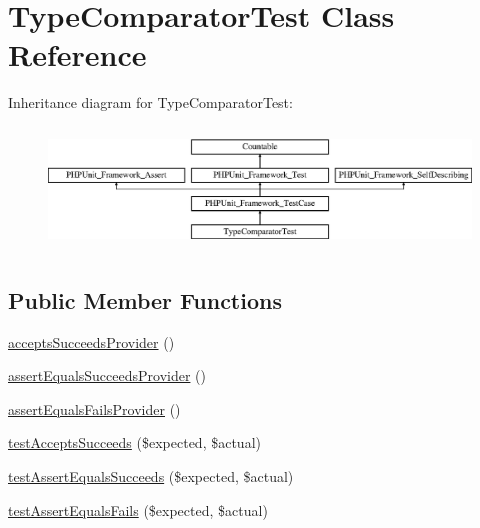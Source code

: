 \hypertarget{class_sebastian_bergmann_1_1_comparator_1_1_type_comparator_test}{}\section{Type\+Comparator\+Test Class Reference}
\label{class_sebastian_bergmann_1_1_comparator_1_1_type_comparator_test}
Inheritance diagram for Type\+Comparator\+Test\+:\begin{figure}[H]
\begin{center}
\leavevmode
\includegraphics[height=3.303835cm]{class_sebastian_bergmann_1_1_comparator_1_1_type_comparator_test}
\end{center}
\end{figure}
\subsection*{Public Member Functions}
\begin{DoxyCompactItemize}
\item 
\mbox{\hyperlink{class_sebastian_bergmann_1_1_comparator_1_1_type_comparator_test_a2ca71e8095ac10e058cd9d7a68da8608}{accepts\+Succeeds\+Provider}} ()
\item 
\mbox{\hyperlink{class_sebastian_bergmann_1_1_comparator_1_1_type_comparator_test_acb6bc1b6e9d32990bdd287f8b590a5fa}{assert\+Equals\+Succeeds\+Provider}} ()
\item 
\mbox{\hyperlink{class_sebastian_bergmann_1_1_comparator_1_1_type_comparator_test_a3cc10e39239b6e3f3fda1d34c0fb1c14}{assert\+Equals\+Fails\+Provider}} ()
\item 
\mbox{\hyperlink{class_sebastian_bergmann_1_1_comparator_1_1_type_comparator_test_a907ea73398b22f4a8cf37728cfc981e3}{test\+Accepts\+Succeeds}} (\$expected, \$actual)
\item 
\mbox{\hyperlink{class_sebastian_bergmann_1_1_comparator_1_1_type_comparator_test_afb51e0f06ccb75cc8ad5b284a2e0c4cc}{test\+Assert\+Equals\+Succeeds}} (\$expected, \$actual)
\item 
\mbox{\hyperlink{class_sebastian_bergmann_1_1_comparator_1_1_type_comparator_test_a8cd8f77da360a8a9822bf4b9c213de5e}{test\+Assert\+Equals\+Fails}} (\$expected, \$actual)
\end{DoxyCompactItemize}

